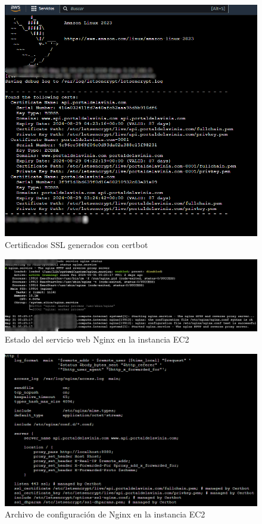 \begin{figure}[H]
    \centering
    \includegraphics[width=1\textwidth]{resources/images/aws-certificates}
    \caption{Certificados SSL generados con certbot}
    \label{fig:certbot}
\end{figure}

\begin{figure}[H]
    \centering
    \includegraphics[width=1\textwidth]{resources/images/aws-nginx}
    \caption{Estado del servicio web Nginx en la instancia EC2}
    \label{fig:nginx}
\end{figure}

\begin{figure}[H]
    \centering
    \includegraphics[width=1\textwidth]{resources/images/aws-nginx-config}
    \caption{Archivo de configuración de Nginx en la instancia EC2}
    \label{fig:nginx-config}
\end{figure}

